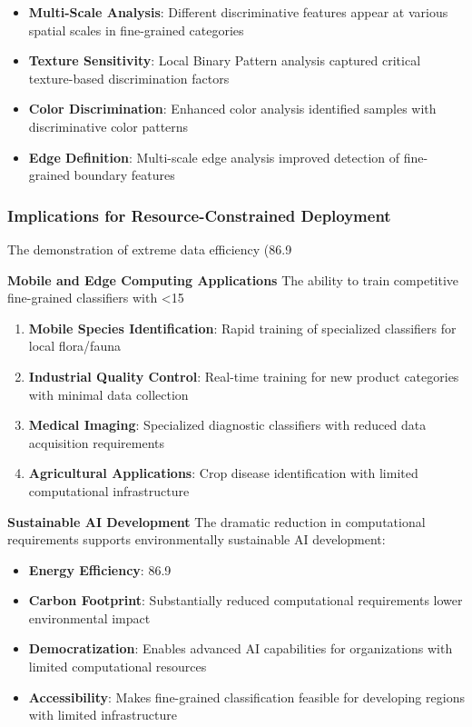 \documentclass[12pt]{article}
\begin{document}
\begin{itemize}
\item \textbf{Multi-Scale Analysis}: Different discriminative features appear at various spatial scales in fine-grained categories
\item \textbf{Texture Sensitivity}: Local Binary Pattern analysis captured critical texture-based discrimination factors
\item \textbf{Color Discrimination}: Enhanced color analysis identified samples with discriminative color patterns
\item \textbf{Edge Definition}: Multi-scale edge analysis improved detection of fine-grained boundary features
\end{itemize}

\subsubsection{Implications for Resource-Constrained Deployment}\label{resource-constrained-implications}

The demonstration of extreme data efficiency (86.9%

\textbf{Mobile and Edge Computing Applications}
The ability to train competitive fine-grained classifiers with <15%

\begin{enumerate}
\item \textbf{Mobile Species Identification}: Rapid training of specialized classifiers for local flora/fauna
\item \textbf{Industrial Quality Control}: Real-time training for new product categories with minimal data collection
\item \textbf{Medical Imaging}: Specialized diagnostic classifiers with reduced data acquisition requirements
\item \textbf{Agricultural Applications}: Crop disease identification with limited computational infrastructure
\end{enumerate}

\textbf{Sustainable AI Development}
The dramatic reduction in computational requirements supports environmentally sustainable AI development:

\begin{itemize}
\item \textbf{Energy Efficiency}: 86.9%
\item \textbf{Carbon Footprint}: Substantially reduced computational requirements lower environmental impact
\item \textbf{Democratization}: Enables advanced AI capabilities for organizations with limited computational resources
\item \textbf{Accessibility}: Makes fine-grained classification feasible for developing regions with limited infrastructure
\end{itemize}
\end{document}
